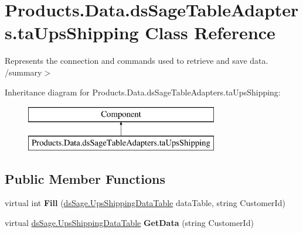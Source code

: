 \hypertarget{class_products_1_1_data_1_1ds_sage_table_adapters_1_1ta_ups_shipping}{}\section{Products.\+Data.\+ds\+Sage\+Table\+Adapters.\+ta\+Ups\+Shipping Class Reference}
\label{class_products_1_1_data_1_1ds_sage_table_adapters_1_1ta_ups_shipping}


Represents the connection and commands used to retrieve and save data. /summary$>$  


Inheritance diagram for Products.\+Data.\+ds\+Sage\+Table\+Adapters.\+ta\+Ups\+Shipping\+:\begin{figure}[H]
\begin{center}
\leavevmode
\includegraphics[height=2.000000cm]{class_products_1_1_data_1_1ds_sage_table_adapters_1_1ta_ups_shipping}
\end{center}
\end{figure}
\subsection*{Public Member Functions}
\begin{DoxyCompactItemize}
\item 
virtual int {\bfseries Fill} (\hyperlink{class_products_1_1_data_1_1ds_sage_1_1_ups_shipping_data_table}{ds\+Sage.\+Ups\+Shipping\+Data\+Table} data\+Table, string Customer\+Id)\hypertarget{class_products_1_1_data_1_1ds_sage_table_adapters_1_1ta_ups_shipping_a98248d6ca1e89bf48212435dcc696bad}{}\label{class_products_1_1_data_1_1ds_sage_table_adapters_1_1ta_ups_shipping_a98248d6ca1e89bf48212435dcc696bad}

\item 
virtual \hyperlink{class_products_1_1_data_1_1ds_sage_1_1_ups_shipping_data_table}{ds\+Sage.\+Ups\+Shipping\+Data\+Table} {\bfseries Get\+Data} (string Customer\+Id)\hypertarget{class_products_1_1_data_1_1ds_sage_table_adapters_1_1ta_ups_shipping_affd60c79ef91d2294d6dbd7ae1797ab0}{}\label{class_products_1_1_data_1_1ds_sage_table_adapters_1_1ta_ups_shipping_affd60c79ef91d2294d6dbd7ae1797ab0}

\end{DoxyCompactItemize}
